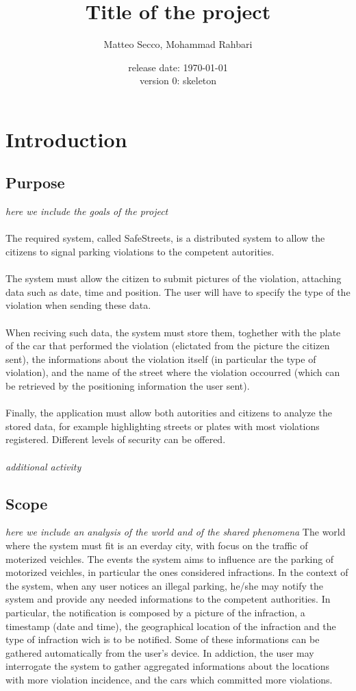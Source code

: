 \documentclass{article}
\title{Title of the project}
\date{release date: \today\\version 0: skeleton}
\author{Matteo Secco, Mohammad Rahbari}
\begin{document}
\maketitle
\newpage
\tableofcontents
\pagebreak
{}
\section{Introduction}
	\subsection{Purpose} \textit{here we	 include	 the	 goals of the project}\\\\
The required system, called SafeStreets, is a distributed system to allow the citizens to signal parking violations to the competent autorities.\\\\
The system must allow the citizen to submit pictures of the violation, attaching data such as date, time and position. The user will have to specify the type of the violation when sending these data. \\\\
When reciving such data, the system must store them, toghether with the plate of the car that performed the violation (elictated from the picture the citizen sent), the informations about the violation itself (in particular the type of violation), and the name of the street where the violation occourred (which can be retrieved by the positioning information the user sent).\\\\
Finally, the application must allow both autorities and citizens to analyze the stored data, for example highlighting streets or plates with most violations registered. Different levels of security can be offered.\\\\
\textit{additional activity}

	\subsection{Scope} \textit{here we include an analysis of the world and of the shared phenomena}
	The world where the system must fit is an everday city, with focus on the traffic of moterized veichles.
	The events the system aims to influence are the parking of motorized veichles,  in particular the ones considered infractions.
	In the context of the system, when any user notices an illegal parking, he/she may notify the system and provide any needed informations to the competent authorities. In particular, the notification is composed by a picture of the infraction, a timestamp (date and time), the geographical location of the infraction and the type of infraction wich is to be notified. Some of these informations can be gathered automatically from the user's device.
	In addiction, the user may interrogate the system to gather aggregated informations about the locations with more violation incidence, and the cars which committed more violations. 
\end{document}
